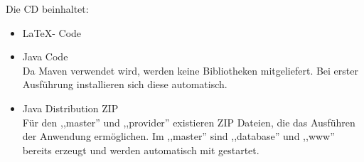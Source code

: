 \documentclass[oneside, ngerman, toc=bibliography,bibliography=totoc,listof=entryprefix, open=right,numbers=noenddot,fontsize=12pt]{scrbook}
\begin{document}
Die CD beinhaltet:
\begin{itemize}
    \item \LaTeX - Code
    \item Java Code \\
    Da Maven verwendet wird, werden keine Bibliotheken mitgeliefert. Bei erster Ausführung installieren sich diese automatisch.
    \item Java Distribution ZIP\\
    Für den ,,master'' und ,,provider'' existieren ZIP Dateien, die das Ausführen der Anwendung ermöglichen.
    Im ,,master'' sind ,,database'' und ,,www'' bereits erzeugt und werden automatisch mit gestartet.
\end{itemize}



\appendix
\cleardoublepage{}


\printindex
\printglossaries


\backmatter{}

% 

%

\end{document}
